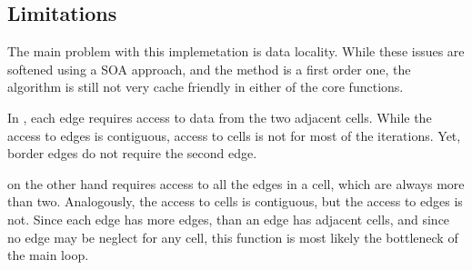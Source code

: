 \subsection{Limitations}

The main problem with this implemetation is data locality. While these issues are softened using a SOA approach, and the method is a first order one, the algorithm is still not very cache friendly in either of the core functions.

In \computeflux, each edge requires access to data from the two adjacent cells. While the access to edges is contiguous, access to cells is not for most of the iterations. Yet, border edges do not require the second edge.

\update on the other hand requires access to all the edges in a cell, which are always more than two. Analogously, the access to cells is contiguous, but the access to edges is not. Since each edge has more edges, than an edge has adjacent cells, and since no edge may be neglect for any cell, this function is most likely the bottleneck of the main loop.